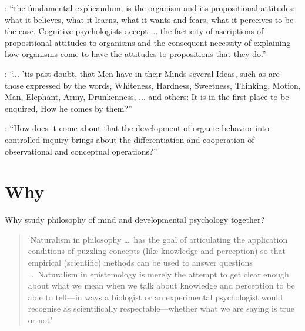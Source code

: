 \documentclass[12pt,\papersize]{extarticle}
\begin{document}
\citep[p.\ 198]{Fodor:1975pb}: “the fundamental explicandum, is the organism and its propositional attitudes: what it believes, what it learns, what it wants and fears, what it perceives to be the case. Cognitive psychologists accept ... the facticity of ascriptions of propositional attitudes to organisms and the consequent necessity of explaining how organisms come to have the attitudes to propositions that they do.”

\citep[p.\ 104]{Locke:1975qo}: “... ’tis past doubt, that Men have in their Minds several Ideas, such as are those expressed by the words, Whiteness, Hardness, Sweetness, Thinking, Motion, Man, Elephant, Army, Drunkenness, ... and others: It is in the first place to be enquired, How he comes by them?”

\citep[p.\ 12]{Dewey:1938yp}: “How does it come about that the development of organic behavior into controlled inquiry brings about the differentiation and cooperation of observational and conceptual operations?”

\section{Why}
Why study philosophy of mind and developmental psychology together?

\begin{quote}
`Naturalism in philosophy …\ has the goal of articulating the application conditions of puzzling concepts (like knowledge and perception) so that empirical (scientific) methods can be used to answer questions  …\ Naturalism in epistemology is merely the attempt to get clear enough about what we mean when we talk about knowledge and perception to be able to tell—in ways a biologist or an experimental psychologist would recognise as scientifically respectable—whether what we are saying is true or not' \citep[p.\ x]{Dretske:2000ky}
\end{quote}


\end{document}
